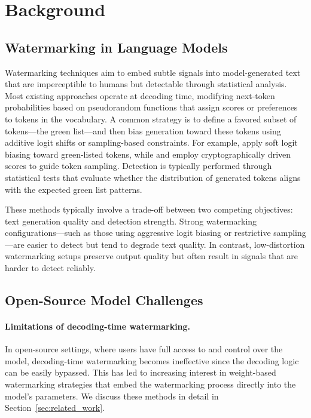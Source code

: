 \section{Background}
\label{sec:background}

\subsection{Watermarking in Language Models}

Watermarking techniques aim to embed subtle signals into model-generated text that are imperceptible to humans but detectable through statistical analysis. Most existing approaches operate at decoding time, modifying next-token probabilities based on pseudorandom functions that assign scores or preferences to tokens in the vocabulary. A common strategy is to define a favored subset of tokens—the green list—and then bias generation toward these tokens using additive logit shifts or sampling-based constraints. For example, \citet{kirchenbauer2023watermark} apply soft logit biasing toward green-listed tokens, while \citet{aaronson2023reform} and \citet{kuditipudi2023robust} employ cryptographically driven scores to guide token sampling. Detection is typically performed through statistical tests that evaluate whether the distribution of generated tokens aligns with the expected green list patterns.

These methods typically involve a trade-off between two competing objectives: text generation quality and detection strength. Strong watermarking configurations—such as those using aggressive logit biasing or restrictive sampling—are easier to detect but tend to degrade text quality. In contrast, low-distortion watermarking setups preserve output quality but often result in signals that are harder to detect reliably.

\subsection{Open-Source Model Challenges}

\paragraph{Limitations of decoding-time watermarking.}
In open-source settings, where users have full access to and control over the model, decoding-time watermarking becomes ineffective since the decoding logic can be easily bypassed. This has led to increasing interest in weight-based watermarking strategies that embed the watermarking process directly into the model's parameters. We discuss these methods in detail in Section~\ref{sec:related_work}.


